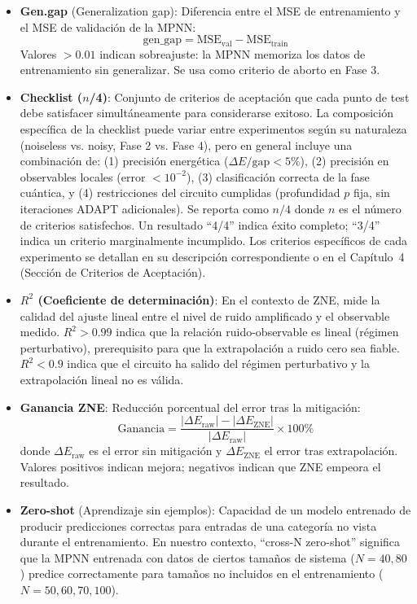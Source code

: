 \documentclass[11pt,a4paper,spanish]{book}
\begin{document}
\begin{itemize}
    \item \textbf{Gen.gap} (Generalization gap): Diferencia entre el MSE de entrenamiento y el MSE de validación de la MPNN:
    \begin{equation}
    \text{gen\_gap} = \text{MSE}_{\text{val}} - \text{MSE}_{\text{train}}
    \end{equation}
    Valores $> 0.01$ indican sobreajuste: la MPNN memoriza los datos de entrenamiento sin generalizar. Se usa como criterio de aborto en Fase 3.

    \item \textbf{Checklist ($n$/4)}: Conjunto de criterios de aceptación que cada punto de test debe satisfacer simultáneamente para considerarse exitoso. La composición específica de la checklist puede variar entre experimentos según su naturaleza (noiseless vs. noisy, Fase 2 vs. Fase 4), pero en general incluye una combinación de: (1) precisión energética ($\Delta E/\text{gap} < 5\%$), (2) precisión en observables locales (error $< 10^{-2}$), (3) clasificación correcta de la fase cuántica, y (4) restricciones del circuito cumplidas (profundidad $p$ fija, sin iteraciones ADAPT adicionales). Se reporta como $n/4$ donde $n$ es el número de criterios satisfechos. Un resultado ``4/4'' indica éxito completo; ``3/4'' indica un criterio marginalmente incumplido. Los criterios específicos de cada experimento se detallan en su descripción correspondiente o en el Capítulo~4 (Sección de Criterios de Aceptación).

    \item \textbf{$R^2$ (Coeficiente de determinación)}: En el contexto de ZNE, mide la calidad del ajuste lineal entre el nivel de ruido amplificado y el observable medido. $R^2 > 0.99$ indica que la relación ruido-observable es lineal (régimen perturbativo), prerequisito para que la extrapolación a ruido cero sea fiable. $R^2 < 0.9$ indica que el circuito ha salido del régimen perturbativo y la extrapolación lineal no es válida.

    \item \textbf{Ganancia ZNE}: Reducción porcentual del error tras la mitigación:
    \begin{equation}
    \text{Ganancia} = \frac{|\Delta E_{\text{raw}}| - |\Delta E_{\text{ZNE}}|}{|\Delta E_{\text{raw}}|} \times 100\%
    \end{equation}
    donde $\Delta E_{\text{raw}}$ es el error sin mitigación y $\Delta E_{\text{ZNE}}$ el error tras extrapolación. Valores positivos indican mejora; negativos indican que ZNE empeora el resultado.

    \item \textbf{Zero-shot} (Aprendizaje sin ejemplos): Capacidad de un modelo entrenado de producir predicciones correctas para entradas de una categoría no vista durante el entrenamiento. En nuestro contexto, ``cross-N zero-shot'' significa que la MPNN entrenada con datos de ciertos tamaños de sistema ($N=40, 80$) predice correctamente para tamaños no incluidos en el entrenamiento ($N=50, 60, 70, 100$).
\end{itemize}
\end{document}

